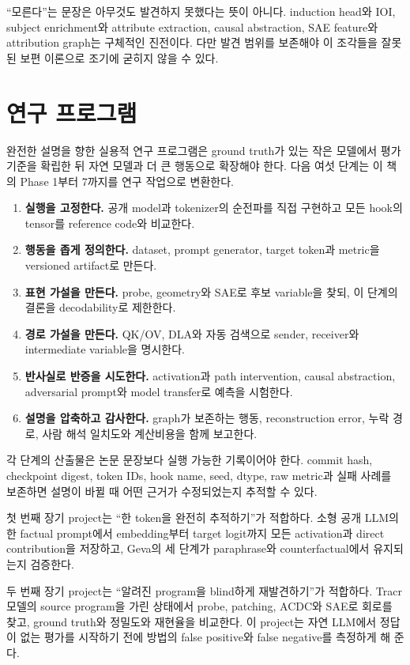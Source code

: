 ``모른다''는 문장은 아무것도 발견하지 못했다는 뜻이 아니다.
induction head와 IOI, subject enrichment와 attribute extraction, causal abstraction, SAE feature와 attribution graph는 구체적인 진전이다.
다만 발견 범위를 보존해야 이 조각들을 잘못된 보편 이론으로 조기에 굳히지 않을 수 있다.

\section{연구 프로그램}

완전한 설명을 향한 실용적 연구 프로그램은 ground truth가 있는 작은 모델에서 평가 기준을 확립한 뒤 자연 모델과 더 큰 행동으로 확장해야 한다.
다음 여섯 단계는 이 책의 Phase 1부터 7까지를 연구 작업으로 변환한다.

\begin{enumerate}
  \item \textbf{실행을 고정한다.} 공개 model과 tokenizer의 순전파를 직접 구현하고 모든 hook의 tensor를 reference code와 비교한다.
  \item \textbf{행동을 좁게 정의한다.} dataset, prompt generator, target token과 metric을 versioned artifact로 만든다.
  \item \textbf{표현 가설을 만든다.} probe, geometry와 SAE로 후보 variable을 찾되, 이 단계의 결론을 decodability로 제한한다.
  \item \textbf{경로 가설을 만든다.} QK/OV, DLA와 자동 검색으로 sender, receiver와 intermediate variable을 명시한다.
  \item \textbf{반사실로 반증을 시도한다.} activation과 path intervention, causal abstraction, adversarial prompt와 model transfer로 예측을 시험한다.
  \item \textbf{설명을 압축하고 감사한다.} graph가 보존하는 행동, reconstruction error, 누락 경로, 사람 해석 일치도와 계산비용을 함께 보고한다.
\end{enumerate}

각 단계의 산출물은 논문 문장보다 실행 가능한 기록이어야 한다.
commit hash, checkpoint digest, token IDs, hook name, seed, dtype, raw metric과 실패 사례를 보존하면 설명이 바뀔 때 어떤 근거가 수정되었는지 추적할 수 있다.

첫 번째 장기 project는 ``한 token을 완전히 추적하기''가 적합하다.
소형 공개 LLM의 한 factual prompt에서 embedding부터 target logit까지 모든 activation과 direct contribution을 저장하고, Geva의 세 단계가 paraphrase와 counterfactual에서 유지되는지 검증한다.

두 번째 장기 project는 ``알려진 program을 blind하게 재발견하기''가 적합하다.
Tracr 모델의 source program을 가린 상태에서 probe, patching, ACDC와 SAE로 회로를 찾고, ground truth와 정밀도와 재현율을 비교한다.
이 project는 자연 LLM에서 정답이 없는 평가를 시작하기 전에 방법의 false positive와 false negative를 측정하게 해 준다.

